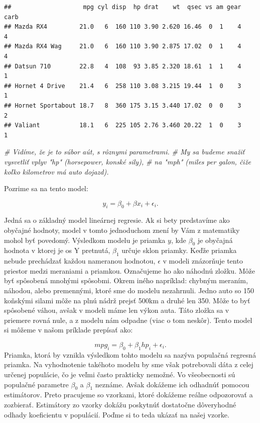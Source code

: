 \documentclass[]{article}
\newenvironment{Shaded}{\begin{snugshade}}{\end{snugshade}}
\newcommand{\CommentTok}[1]{\textcolor[rgb]{0.56,0.35,0.01}{\textit{#1}}}
\begin{document}
\begin{verbatim}
##                    mpg cyl disp  hp drat    wt  qsec vs am gear carb
## Mazda RX4         21.0   6  160 110 3.90 2.620 16.46  0  1    4    4
## Mazda RX4 Wag     21.0   6  160 110 3.90 2.875 17.02  0  1    4    4
## Datsun 710        22.8   4  108  93 3.85 2.320 18.61  1  1    4    1
## Hornet 4 Drive    21.4   6  258 110 3.08 3.215 19.44  1  0    3    1
## Hornet Sportabout 18.7   8  360 175 3.15 3.440 17.02  0  0    3    2
## Valiant           18.1   6  225 105 2.76 3.460 20.22  1  0    3    1
\end{verbatim}

\begin{Shaded}
\begin{Highlighting}[]
\CommentTok{# Vidíme, že je to súbor aút, s rôznymi parametrami.}
\CommentTok{# My sa budeme snažiť vysvetliť vplyv "hp" (horsepower, konské sily), }
\CommentTok{# na "mph" (miles per galon, čiže koľko kilometrov má auto dojazd).}
\end{Highlighting}
\end{Shaded}

Pozrime sa na tento model:

\[y_i = \beta_0 + \beta{x_i} + \epsilon_i.\]

Jedná sa o základný model lineárnej regresie. Ak si bety predstavíme ako
obyčajné hodnoty, model v tomto jednoduchom znení by Vám z matematiky
mohol byť povedomý. Výsledkom modelu je priamka \(y\), kde \(\beta_0\)
je obyčajná hodnota v ktorej je os Y pretnutá, \(\beta_1\) určuje sklon
priamky. Keďže priamka nebude prechádzať každou nameranou hodnotou,
\(\epsilon\) v modeli znázorňuje tento priestor medzi meraniami a
priamkou. Označujeme ho ako náhodnú zložku. Môže byť spôsobená mnohými
spôsobmi. Okrem iného napríklad: chybným meraním, náhodou, alebo
premennými, ktoré sme do modelu nezahrnuli. Jedno auto so 150 koňskými
silami môže na plnú nádrž prejsť 500km a druhé len 350. Môže to byť
spôsobené váhou, avšak v modeli máme len výkon auta. Táto zložka sa v
priemere rovná nule, a z modelu nám odpadne (viac o tom neskôr). Tento
model si môžeme v našom príklade prepísať ako:

\[mpg_i = \beta_0 + \beta_1{hp_i} + \epsilon_i.\] Priamka, ktorá by
vznikla výsledkom tohto modelu sa nazýva populačná regresná priamka. Na
vyhodnotenie takéhoto modelu by sme však potrebovali dáta z celej
určenej populácie, čo je veľmi často prakticky nemožné. Vo všeobecnosti
sú populačné parametre \(\beta_0\) a \(\beta_1\) neznáme. Avšak dokážeme
ich odhadnúť pomocou estimátorov. Preto pracujeme so vzorkami, ktoré
dokážeme reálne odpozorovať a zozbierať. Estimátory zo vzorky dokážu
poskytnúť dostatočne dôveryhodné odhady koeficientu v populácií. Poďme
si to teda ukázať na našej vzorke.
\end{document}
